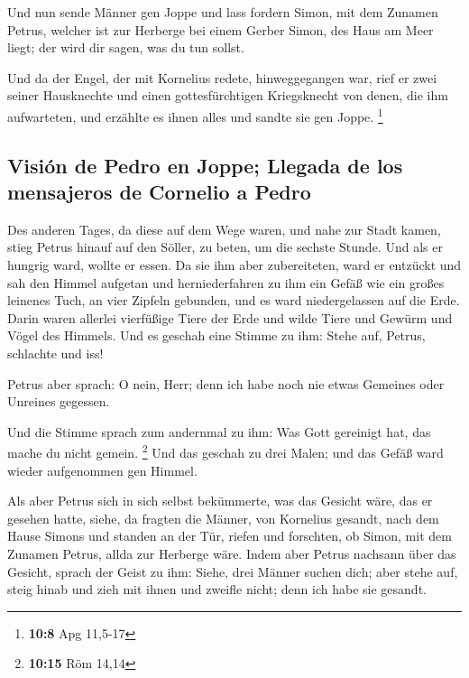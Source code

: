  Und nun sende Männer gen Joppe und lass fordern Simon,
mit dem Zunamen Petrus,  welcher ist zur Herberge bei
einem Gerber Simon, des Haus am Meer liegt; der wird dir sagen, was du
tun sollst.

 Und da der Engel, der mit Kornelius redete,
hinweggegangen war, rief er zwei seiner Hausknechte und einen
gottesfürchtigen Kriegsknecht von denen, die ihm aufwarteten,
 und erzählte es ihnen alles und sandte sie gen Joppe.
\footnote{\textbf{10:8} Apg 11,5-17}

\hypertarget{visiuxf3n-de-pedro-en-joppe-llegada-de-los-mensajeros-de-cornelio-a-pedro}{%
\subsection{Visión de Pedro en Joppe; Llegada de los mensajeros de
Cornelio a
Pedro}\label{visiuxf3n-de-pedro-en-joppe-llegada-de-los-mensajeros-de-cornelio-a-pedro}}

 Des anderen Tages, da diese auf dem Wege waren, und nahe
zur Stadt kamen, stieg Petrus hinauf auf den Söller, zu beten, um die
sechste Stunde.  Und als er hungrig ward, wollte er
essen. Da sie ihm aber zubereiteten, ward er entzückt 
und sah den Himmel aufgetan und herniederfahren zu ihm ein Gefäß wie ein
großes leinenes Tuch, an vier Zipfeln gebunden, und es ward
niedergelassen auf die Erde.  Darin waren allerlei
vierfüßige Tiere der Erde und wilde Tiere und Gewürm und Vögel des
Himmels.  Und es geschah eine Stimme zu ihm: Stehe auf,
Petrus, schlachte und iss!

 Petrus aber sprach: O nein, Herr; denn ich habe noch nie
etwas Gemeines oder Unreines gegessen.

 Und die Stimme sprach zum andernmal zu ihm: Was Gott
gereinigt hat, das mache du nicht gemein. \footnote{\textbf{10:15} Röm
  14,14}  Und das geschah zu drei Malen; und das Gefäß
ward wieder aufgenommen gen Himmel.

 Als aber Petrus sich in sich selbst bekümmerte, was das
Gesicht wäre, das er gesehen hatte, siehe, da fragten die Männer, von
Kornelius gesandt, nach dem Hause Simons und standen an der Tür,
 riefen und forschten, ob Simon, mit dem Zunamen Petrus,
allda zur Herberge wäre.  Indem aber Petrus nachsann über
das Gesicht, sprach der Geist zu ihm: Siehe, drei Männer suchen dich;
 aber stehe auf, steig hinab und zieh mit ihnen und
zweifle nicht; denn ich habe sie gesandt.

